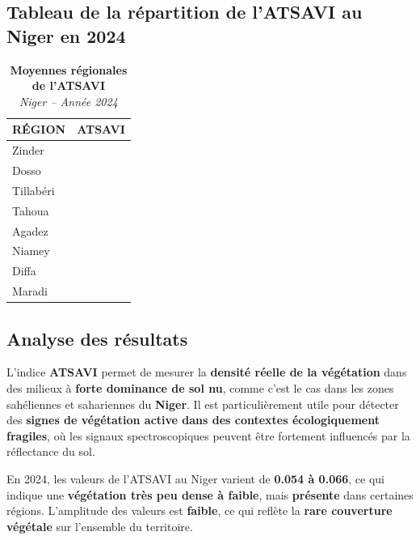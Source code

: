 \documentclass[
]{book}
\begin{document}
\subsection{Tableau de la répartition de l'ATSAVI au Niger en 2024}\label{tableau-de-la-ruxe9partition-de-latsavi-au-niger-en-2024}

\begin{table}[!t]
\caption*{
{\large \textbf{Moyennes régionales de l'ATSAVI}} \\ 
{\small \emph{Niger -- Année 2024}}
} 
\fontsize{12.0pt}{14.4pt}\selectfont
\begin{tabular*}{\linewidth}{@{\extracolsep{\fill}}lr}
\toprule
{RÉGION} & {ATSAVI} \\ 
\midrule\addlinespace[2.5pt]
Zinder & {\cellcolor[HTML]{9CD587}{\textcolor[HTML]{000000}{0.059}}} \\ 
Dosso & {\cellcolor[HTML]{004529}{\textcolor[HTML]{FFFFFF}{0.066}}} \\ 
Tillabéri & {\cellcolor[HTML]{78C679}{\textcolor[HTML]{000000}{0.060}}} \\ 
Tahoua & {\cellcolor[HTML]{9CD587}{\textcolor[HTML]{000000}{0.059}}} \\ 
Agadez & {\cellcolor[HTML]{FFFFE5}{\textcolor[HTML]{000000}{0.054}}} \\ 
Niamey & {\cellcolor[HTML]{FAFDC8}{\textcolor[HTML]{000000}{0.055}}} \\ 
Diffa & {\cellcolor[HTML]{D9F0A3}{\textcolor[HTML]{000000}{0.057}}} \\ 
Maradi & {\cellcolor[HTML]{238443}{\textcolor[HTML]{FFFFFF}{0.063}}} \\ 
\bottomrule
\end{tabular*}
\end{table}

\subsection{Analyse des résultats}\label{analyse-des-ruxe9sultats-9}

L'indice \textbf{ATSAVI} permet de mesurer la \textbf{densité réelle de la végétation} dans des milieux à \textbf{forte dominance de sol nu}, comme c'est le cas dans les zones sahéliennes et sahariennes du \textbf{Niger}. Il est particulièrement utile pour détecter des \textbf{signes de végétation active dans des contextes écologiquement fragiles}, où les signaux spectroscopiques peuvent être fortement influencés par la réflectance du sol.

En 2024, les valeurs de l'ATSAVI au Niger varient de \textbf{0.054 à 0.066}, ce qui indique une \textbf{végétation très peu dense à faible}, mais \textbf{présente} dans certaines régions. L'amplitude des valeurs est \textbf{faible}, ce qui reflète la \textbf{rare couverture végétale} sur l'ensemble du territoire.
\end{document}
